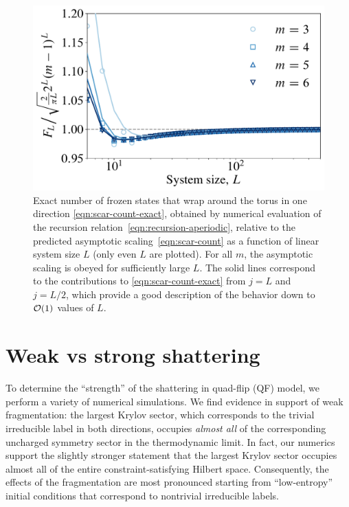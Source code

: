 \begin{figure}[ht!]
    \centering
    \includegraphics[width=0.55\linewidth]{img/exact_scar_count.pdf}
    \caption[Exact counting of frozen states]{Exact number of frozen states that wrap around the torus in one direction \eqref{eqn:scar-count-exact}, obtained by numerical evaluation of the recursion relation~\eqref{eqn:recursion-aperiodic}, relative to the predicted asymptotic scaling~\eqref{eqn:scar-count} as a function of linear system size $L$ (only even $L$ are plotted). For all $m$, the asymptotic scaling is obeyed for sufficiently large $L$. The solid lines correspond to the contributions to \eqref{eqn:scar-count-exact} from $j = L$ and $j = L/2$, which provide a good description of the behavior down to $\cal{O}(1)$ values of $L$.}
    \label{fig:scar-count}
\end{figure}


\section{Weak vs strong shattering}
\label{app:weak-vs-strong}

To determine the ``strength'' of the shattering in quad-flip (QF) model, we perform a variety of numerical simulations.
We find evidence in support of weak fragmentation: the largest Krylov sector, which corresponds to the trivial irreducible label in both directions, occupies \emph{almost all} of the corresponding uncharged symmetry sector in the thermodynamic limit. In fact, our numerics support the slightly stronger statement that the largest Krylov sector occupies almost all of the entire constraint-satisfying Hilbert space. Consequently, the effects of the fragmentation are most pronounced starting from ``low-entropy'' initial conditions that correspond to nontrivial irreducible labels.


